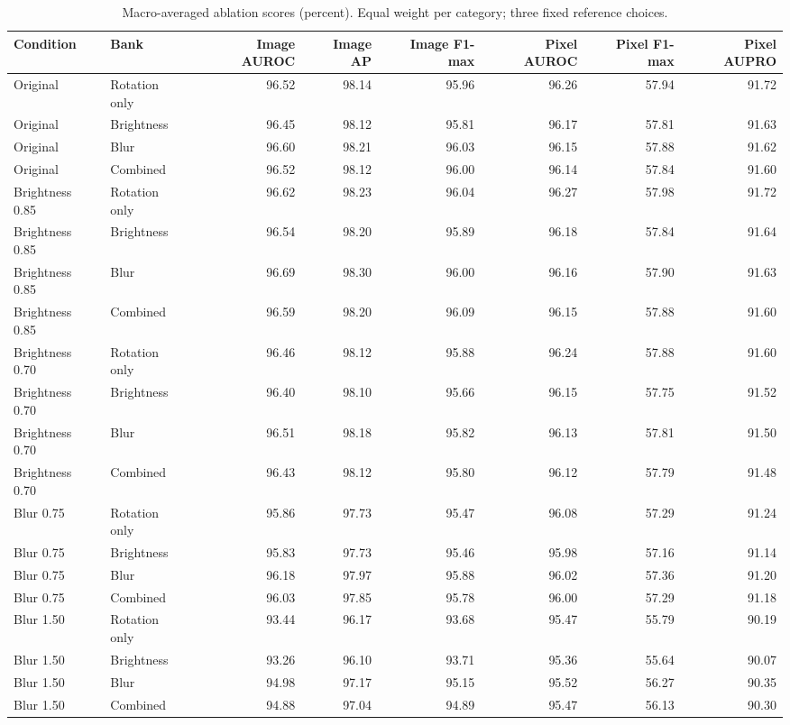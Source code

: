 \begin{table}[htbp]
\caption{Macro-averaged ablation scores (percent). Equal weight per category; three fixed reference choices.}
\label{tab:ablation_all_metrics}
\begin{tabular}{llrrrrrr}
\toprule
Condition & Bank & Image AUROC & Image AP & Image F1-max & Pixel AUROC & Pixel F1-max & Pixel AUPRO \\
\midrule
Original & Rotation only & 96.52 & 98.14 & 95.96 & 96.26 & 57.94 & 91.72 \\
Original & Brightness & 96.45 & 98.12 & 95.81 & 96.17 & 57.81 & 91.63 \\
Original & Blur & 96.60 & 98.21 & 96.03 & 96.15 & 57.88 & 91.62 \\
Original & Combined & 96.52 & 98.12 & 96.00 & 96.14 & 57.84 & 91.60 \\
Brightness 0.85 & Rotation only & 96.62 & 98.23 & 96.04 & 96.27 & 57.98 & 91.72 \\
Brightness 0.85 & Brightness & 96.54 & 98.20 & 95.89 & 96.18 & 57.84 & 91.64 \\
Brightness 0.85 & Blur & 96.69 & 98.30 & 96.00 & 96.16 & 57.90 & 91.63 \\
Brightness 0.85 & Combined & 96.59 & 98.20 & 96.09 & 96.15 & 57.88 & 91.60 \\
Brightness 0.70 & Rotation only & 96.46 & 98.12 & 95.88 & 96.24 & 57.88 & 91.60 \\
Brightness 0.70 & Brightness & 96.40 & 98.10 & 95.66 & 96.15 & 57.75 & 91.52 \\
Brightness 0.70 & Blur & 96.51 & 98.18 & 95.82 & 96.13 & 57.81 & 91.50 \\
Brightness 0.70 & Combined & 96.43 & 98.12 & 95.80 & 96.12 & 57.79 & 91.48 \\
Blur 0.75 & Rotation only & 95.86 & 97.73 & 95.47 & 96.08 & 57.29 & 91.24 \\
Blur 0.75 & Brightness & 95.83 & 97.73 & 95.46 & 95.98 & 57.16 & 91.14 \\
Blur 0.75 & Blur & 96.18 & 97.97 & 95.88 & 96.02 & 57.36 & 91.20 \\
Blur 0.75 & Combined & 96.03 & 97.85 & 95.78 & 96.00 & 57.29 & 91.18 \\
Blur 1.50 & Rotation only & 93.44 & 96.17 & 93.68 & 95.47 & 55.79 & 90.19 \\
Blur 1.50 & Brightness & 93.26 & 96.10 & 93.71 & 95.36 & 55.64 & 90.07 \\
Blur 1.50 & Blur & 94.98 & 97.17 & 95.15 & 95.52 & 56.27 & 90.35 \\
Blur 1.50 & Combined & 94.88 & 97.04 & 94.89 & 95.47 & 56.13 & 90.30 \\
\bottomrule
\end{tabular}
\end{table}
